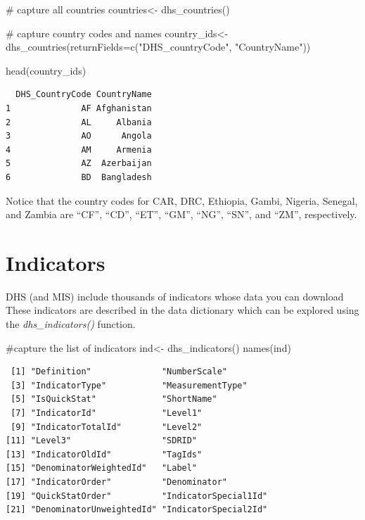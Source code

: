 \documentclass[
  letterpaper,
  DIV=11,
  numbers=noendperiod]{scrreprt}
\newenvironment{Shaded}{\begin{snugshade}}{\end{snugshade}}
\newcommand{\AttributeTok}[1]{\textcolor[rgb]{0.40,0.45,0.13}{#1}}
\newcommand{\CommentTok}[1]{\textcolor[rgb]{0.37,0.37,0.37}{#1}}
\newcommand{\FunctionTok}[1]{\textcolor[rgb]{0.28,0.35,0.67}{#1}}
\newcommand{\NormalTok}[1]{\textcolor[rgb]{0.00,0.23,0.31}{#1}}
\newcommand{\OtherTok}[1]{\textcolor[rgb]{0.00,0.23,0.31}{#1}}
\newcommand{\StringTok}[1]{\textcolor[rgb]{0.13,0.47,0.30}{#1}}
\begin{document}
\begin{Shaded}
\begin{Highlighting}[]
\CommentTok{\# capture all countries}
\NormalTok{countries}\OtherTok{\textless{}{-}} \FunctionTok{dhs\_countries}\NormalTok{()}

\CommentTok{\# capture country codes and names}
\NormalTok{country\_ids}\OtherTok{\textless{}{-}} \FunctionTok{dhs\_countries}\NormalTok{(}\AttributeTok{returnFields=}\FunctionTok{c}\NormalTok{(}\StringTok{"DHS\_countryCode"}\NormalTok{, }\StringTok{"CountryName"}\NormalTok{))}

\FunctionTok{head}\NormalTok{(country\_ids)}
\end{Highlighting}
\end{Shaded}

\begin{verbatim}
  DHS_CountryCode CountryName
1              AF Afghanistan
2              AL     Albania
3              AO      Angola
4              AM     Armenia
5              AZ  Azerbaijan
6              BD  Bangladesh
\end{verbatim}

Notice that the country codes for CAR, DRC, Ethiopia, Gambi, Nigeria,
Senegal, and Zambia are ``CF'', ``CD'', ``ET'', ``GM'', ``NG'', ``SN'',
and ``ZM'', respectively.

\hypertarget{indicators}{%
\section{Indicators}\label{indicators}}

DHS (and MIS) include thousands of indicators whose data you can
download These indicators are described in the data dictionary which can
be explored using the \emph{dhs\_indicators()} function.

\begin{Shaded}
\begin{Highlighting}[]
\CommentTok{\#capture the list of indicators}
\NormalTok{ind}\OtherTok{\textless{}{-}} \FunctionTok{dhs\_indicators}\NormalTok{()}
\FunctionTok{names}\NormalTok{(ind)}
\end{Highlighting}
\end{Shaded}

\begin{verbatim}
 [1] "Definition"              "NumberScale"            
 [3] "IndicatorType"           "MeasurementType"        
 [5] "IsQuickStat"             "ShortName"              
 [7] "IndicatorId"             "Level1"                 
 [9] "IndicatorTotalId"        "Level2"                 
[11] "Level3"                  "SDRID"                  
[13] "IndicatorOldId"          "TagIds"                 
[15] "DenominatorWeightedId"   "Label"                  
[17] "IndicatorOrder"          "Denominator"            
[19] "QuickStatOrder"          "IndicatorSpecial1Id"    
[21] "DenominatorUnweightedId" "IndicatorSpecial2Id"    
\end{verbatim}
\end{document}
